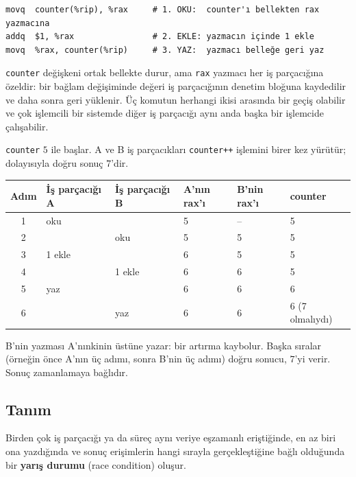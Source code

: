 \documentclass[11pt,a4paper]{article}
\begin{document}
\begin{lstlisting}[style=term]
movq  counter(%rip), %rax     # 1. OKU:  counter'ı bellekten rax yazmacına
addq  $1, %rax                # 2. EKLE: yazmacın içinde 1 ekle
movq  %rax, counter(%rip)     # 3. YAZ:  yazmacı belleğe geri yaz
\end{lstlisting}

\texttt{counter} değişkeni ortak bellekte durur, ama \texttt{rax} yazmacı her iş parçacığına özeldir: bir bağlam değişiminde değeri iş parçacığının denetim bloğuna kaydedilir ve daha sonra geri yüklenir. Üç komutun herhangi ikisi arasında bir geçiş olabilir ve çok işlemcili bir sistemde diğer iş parçacığı aynı anda başka bir işlemcide çalışabilir.

\begin{example}
\texttt{counter} $5$ ile başlar. A ve B iş parçacıkları \texttt{counter++} işlemini birer kez yürütür; dolayısıyla doğru sonuç $7$'dir.
\begin{center}
\renewcommand{\arraystretch}{1.15}
\begin{tabular}{@{}clllll@{}}
\toprule
\textbf{Adım} & \textbf{İş parçacığı A} & \textbf{İş parçacığı B} & \textbf{A'nın rax'ı} & \textbf{B'nin rax'ı} & \textbf{counter}\\
\midrule
1 & oku & & 5 & -- & 5\\
2 & & oku & 5 & 5 & 5\\
3 & 1 ekle & & 6 & 5 & 5\\
4 & & 1 ekle & 6 & 6 & 5\\
5 & yaz & & 6 & 6 & 6\\
6 & & yaz & 6 & 6 & 6 (7 olmalıydı)\\
\bottomrule
\end{tabular}
\end{center}
B'nin yazması A'nınkinin üstüne yazar: bir artırma kaybolur. Başka sıralar (örneğin önce A'nın üç adımı, sonra B'nin üç adımı) doğru sonucu, $7$'yi verir. Sonuç zamanlamaya bağlıdır.
\end{example}

\subsection{Tanım}

\begin{keyidea}
Birden çok iş parçacığı ya da süreç aynı veriye eşzamanlı eriştiğinde, en az biri ona yazdığında ve sonuç erişimlerin hangi sırayla gerçekleştiğine bağlı olduğunda bir \textbf{yarış durumu} (race condition) oluşur.
\end{keyidea}
\end{document}
